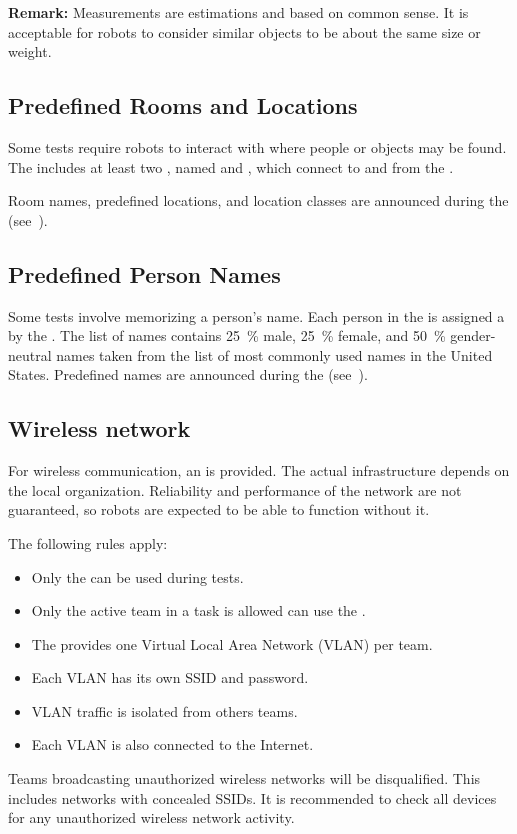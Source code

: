 \noindent\textbf{Remark:} Measurements are estimations and based on common sense. It is acceptable for robots to consider similar objects to be about the same size or weight.

%
%

\subsection{Predefined Rooms and Locations}\label{rule:scenario_locations}

Some tests require robots to interact with \PredefinedLocation{} where people or objects may be found.
The \Arena{} includes at least two , named \Entrance{} and \Exit{}, which connect to and from the \Arena{}.

Room names, predefined locations, and location classes are announced during the \SetupDays{} (see~).

\subsection{Predefined Person Names}\label{rule:scenario_names}

Some tests involve memorizing a person's name.
Each person in the \Arena{} is assigned a \PredefinedName{} by the \TC{}.
The list of names contains \SI{25}{\percent} male, \SI{25}{\percent} female, and \SI{50}{\percent} gender-neutral names taken from the list of most commonly used names in the United States.
Predefined names are announced during the \SetupDays{} (see~).

\subsection{Wireless network}\label{rule:scenario_wifi}

For wireless communication, an \ArenaNetwork{} is provided.
The actual infrastructure depends on the local organization.
Reliability and performance of the network are not guaranteed, so robots are expected to be able to function without it.

The following rules apply:
\begin{itemize}
	\item Only the \ArenaNetwork{} can be used during tests.
	\item Only the active team in a task is allowed can use the \ArenaNetwork{}.
	\item The \ArenaNetwork{} provides one Virtual Local Area Network (VLAN) per team.
	\item Each VLAN has its own SSID and password.
	\item VLAN traffic is isolated from others teams.
	\item Each VLAN is also connected to the Internet.
\end{itemize}

Teams broadcasting unauthorized wireless networks will be disqualified.
This includes networks with concealed SSIDs.
It is recommended to check all devices for any unauthorized wireless network activity.


